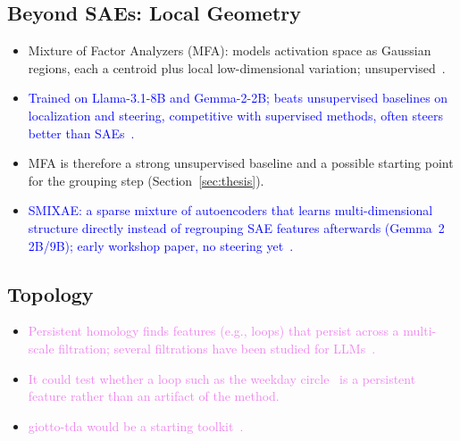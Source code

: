\documentclass[11pt,a4paper]{article}
\newcommand{\fromextra}[1]{\textcolor{blue}{#1}}
\newcommand{\fromold}[1]{\textcolor{violet}{#1}}
\newcommand{\fromclaude}[1]{\textcolor{orange!85!black}{#1}}
\newcommand{\fromextra}[1]{#1}
\newcommand{\fromold}[1]{#1}
\newcommand{\fromclaude}[1]{#1}
\begin{document}
\subsection{Beyond SAEs: Local Geometry}
\begin{itemize}
  \item Mixture of Factor Analyzers (MFA): models activation space as Gaussian regions, each a centroid plus local low-dimensional variation; unsupervised~\cite{shafran2026regions}.
  \item \fromextra{Trained on Llama-3.1-8B and Gemma-2-2B; beats unsupervised baselines on localization and steering, competitive with supervised methods, often steers better than SAEs~\cite{shafran2026regions}.}
  \item \fromclaude{MFA is therefore a strong unsupervised baseline and a possible starting point for the grouping step (Section~\ref{sec:thesis}).}
  \item \fromextra{SMIXAE: a sparse mixture of autoencoders that learns multi-dimensional structure directly instead of regrouping SAE features afterwards (Gemma~2 2B/9B); early workshop paper, no steering yet~\cite{francel2026smixae}.}
\end{itemize}

\subsection{Topology}
\begin{itemize}
  \item \fromold{Persistent homology finds features (e.g., loops) that persist across a multi-scale filtration; several filtrations have been studied for LLMs~\cite{gardinazzi2024persistent}.}
  \item \fromold{It could test whether a loop such as the weekday circle~\cite{engels2025notall} is a persistent feature rather than an artifact of the method.}
  \item \fromold{giotto-tda would be a starting toolkit~\cite{tauzin2021giotto}.}
\end{itemize}
\end{document}
